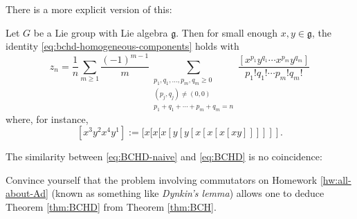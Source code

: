 \documentclass[reqno]{amsart} 
\begin{document}
There is a more explicit version of this:
\begin{theorem}\label{thm:BCHD}
  Let $G$ be a Lie group with Lie algebra $\mathfrak{g}$.  Then for small enough $x,y \in \mathfrak{g}$, the identity \eqref{eq:bchd-homogeneous-components} holds with
  \begin{equation}\label{eq:BCHD}
    z_n
    = \frac{1}{n}
    \sum_{m \geq 1}
    \frac{(-1)^{m-1}}{m}
    \sum _{\substack{
        p_1,q_1,\dotsc,p_m,q_m \geq 0  \\  
        (p_j,q_j) \neq (0,0) \\
        p_1+q_1+\dotsb+p_m+q_m=n
      }
    }
    \frac{[x^{p_1} y^{q_1} \dotsb x^{p_m} y^{q_m}]}{
      p_1! q_1! \dotsb p_m! q_m!}
  \end{equation}
  where, for instance,
  \begin{equation*}
    {} [x^3 y^2 x^4 y^1] := [x[x[x[y[y[x[x[x[x y]]]]]].
  \end{equation*}
\end{theorem}
The similarity between \eqref{eq:BCHD-naive} and \eqref{eq:BCHD} is no coincidence:
\begin{exercise}
  Convince yourself that the problem involving commutators on Homework \ref{hw:all-about-Ad} (known as something like \emph{Dynkin's lemma}) allows one to deduce Theorem \ref{thm:BCHD} from Theorem \ref{thm:BCH}.
\end{exercise}
\end{document}
